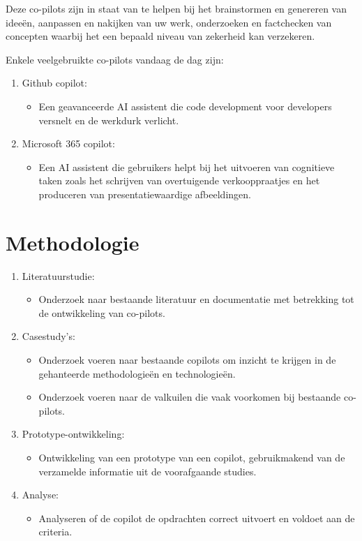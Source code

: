 \documentclass{hogent-article}
\begin{document}
    Deze co-pilots zijn in staat van te helpen bij het brainstormen en genereren van ideeën, aanpassen en nakijken van uw werk, onderzoeken en factchecken van concepten waarbij het een bepaald niveau van zekerheid kan verzekeren. 
    
    Enkele veelgebruikte co-pilots vandaag de dag zijn: 
    \begin{enumerate}
        \item Github copilot:
        \begin{itemize}
            \item Een geavanceerde AI assistent die code development voor developers versnelt en de werkdurk verlicht. 
        \end{itemize}
        \item Microsoft 365 copilot: 
        \begin{itemize}
            \item Een AI assistent die gebruikers helpt bij het uitvoeren van cognitieve taken zoals het schrijven van overtuigende verkooppraatjes en het produceren van presentatiewaardige afbeeldingen. 
        \end{itemize}
    \end{enumerate}
    
    
    \section{Methodologie}
    \begin{enumerate}
        \item Literatuurstudie: 
        \begin{itemize}
            \item Onderzoek naar bestaande literatuur en documentatie met betrekking tot de ontwikkeling van co-pilots.
        \end{itemize}
        \item Casestudy's: 
        \begin{itemize}
            \item Onderzoek voeren naar bestaande copilots om inzicht te krijgen in de gehanteerde methodologieën en technologieën.
            \item Onderzoek voeren naar de valkuilen die vaak voorkomen bij bestaande co-pilots. 
        \end{itemize}
        \item Prototype-ontwikkeling: 
        \begin{itemize}
            \item Ontwikkeling van een prototype van een copilot, gebruikmakend van de verzamelde informatie uit de voorafgaande studies.
        \end{itemize}
        \item Analyse:
        \begin{itemize}
            \item Analyseren of de copilot de opdrachten correct uitvoert en voldoet aan de criteria.
        \end{itemize}
    \end{enumerate}
    
\end{document}
